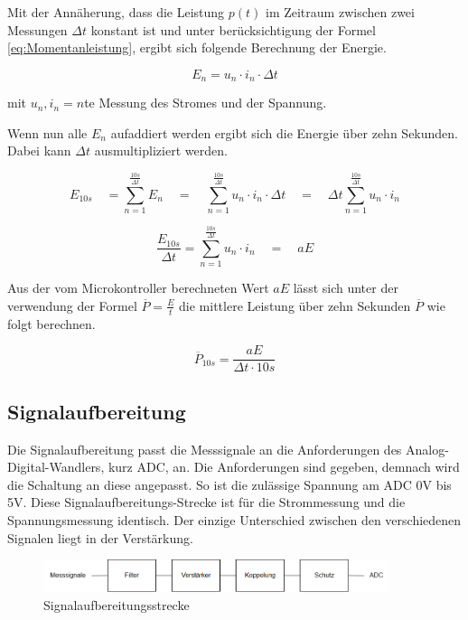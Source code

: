 Mit der Annäherung, dass die Leistung $p(t)$ im Zeitraum zwischen zwei Messungen $\Delta t$ konstant ist und unter berücksichtigung der Formel \ref{eq:Momentanleistung}, ergibt sich folgende Berechnung der Energie.

\begin{equation}
	E_n = u_n \cdot i_n \cdot \Delta t
\end{equation}
\label{eq:energie2}

mit	$u_n, i_n = n $te Messung des Stromes und der Spannung.

Wenn nun alle $E_n$ aufaddiert werden ergibt sich die Energie über zehn Sekunden. Dabei kann $\Delta t$ ausmultipliziert werden.

\begin{equation}
	E_{10s}\quad = \sum_{n=1}^{ \frac{10s}{\Delta t} } E_n \quad = \quad \sum_{n=1}^{ \frac{10s}{\Delta t} } u_n \cdot i_n \cdot \Delta t \quad = \quad \Delta t \sum_{n=1}^{ \frac{10s}{\Delta t} } u_n \cdot i_n
\end{equation}
\label{eq:energie3}

\begin{equation*}
	\frac{E_{10s}}{\Delta t} = \sum_{n=1}^{ \frac{10s}{\Delta t} } u_n \cdot i_n \quad = \quad aE
\end{equation*}
	
Aus der vom Microkontroller berechneten Wert $aE$ lässt sich unter der verwendung der Formel $ \overline{P} = \frac{E}{t} $ die mittlere Leistung über zehn Sekunden $\overline{P}$ wie folgt berechnen.

\begin{equation}
	\overline{P}_{10s} = \frac{aE}{\Delta t \cdot 10s}
\end{equation}
\label{eq:mittlere_Leistung}

\subsection{Signalaufbereitung}%
Die Signalaufbereitung passt die Messsignale an die Anforderungen des Analog-Digital-Wandlers, kurz ADC, an. Die Anforderungen sind gegeben, demnach wird die Schaltung an diese angepasst. So ist die zulässige Spannung am ADC 0V bis 5V. Diese Signalaufbereitungs-Strecke ist für die Strommessung und die Spannungsmessung identisch. Der einzige Unterschied zwischen den verschiedenen Signalen liegt in der Verstärkung.

\begin{figure}[H]
\begin{center}
\includegraphics[width=0.9\textwidth]{images/Technische_Grundlagen_Signalaufbereitung.png}
\caption{Signalaufbereitungsstrecke}
\end{center}
\end{figure}

